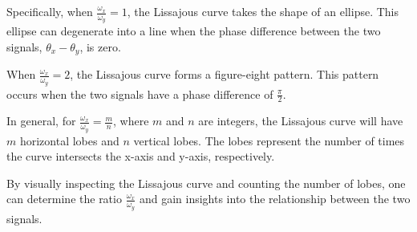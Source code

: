 \documentclass[11pt]{article}
\begin{document}
\begin{question}
\begin{subquestion}
{            Specifically, when \(\frac{\omega_x}{\omega_y} = 1\), the Lissajous curve takes the shape of an ellipse. This ellipse can degenerate
            into a line when the phase difference
            between the two signals, \(\theta_x - \theta_y\), is zero.

            When \(\frac{\omega_x}{\omega_y} = 2\), the Lissajous
            curve forms a figure-eight pattern. This pattern occurs
            when the two signals have a phase difference
            of \(\frac{\pi}{2}\).

            In general, for \(\frac{\omega_x}{\omega_y} = \frac{m}{n}\),
            where \(m\) and \(n\) are integers, the Lissajous
            curve will have \(m\) horizontal lobes and \(n\)
            vertical lobes. The lobes represent the number of
            times the curve intersects the x-axis and y-axis,
            respectively.

            By visually inspecting the Lissajous curve and
            counting the number of lobes, one can determine
            the ratio \(\frac{\omega_x}{\omega_y}\) and gain
            insights into the relationship between the two signals.
        }
    \end{subquestion}

\end{question}



\begin{question}


\end{question}

\end{document}

